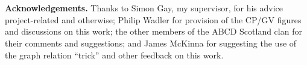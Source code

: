 \\~\\
{\bf Acknowledgements.} Thanks to Simon Gay, my supervisor, for his advice
project-related and otherwise; Philip Wadler for provision of the CP/GV
figures and discussions on this work; the other members of the ABCD Scotland
clan for their comments and suggestions; and James McKinna for suggesting the
use of the graph relation ``trick'' and other feedback on this work.

